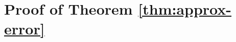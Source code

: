 \documentclass{article}
\newcommand{\Acal}{\mathcal{A}}
\begin{document}
\section{Proof of Theorem \ref{thm:approx-error}}
\label{app:approx-proof}
\end{document}
